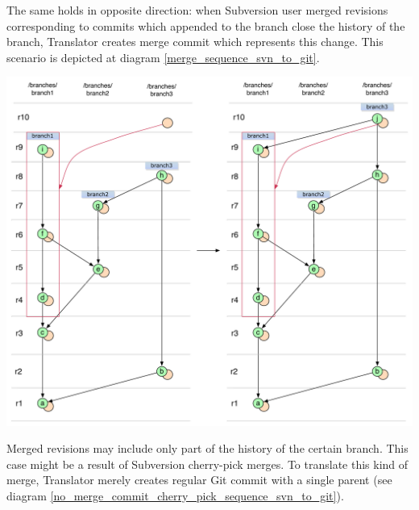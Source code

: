 The same holds in opposite direction: when Subversion user merged revisions corresponding to commits which appended to the branch close the history of the branch, Translator creates merge commit which represents this change. This scenario is depicted at diagram \ref{merge_sequence_svn_to_git}.

\begin{center}
\includegraphics[width=\textwidth]{img/diagrams/merge_sequence_svn_to_git.pdf}%
\label{merge_sequence_svn_to_git}%
\end{center}

Merged revisions may include only part of the history of the certain branch. 
This case might be a result of Subversion cherry-pick merges.
To translate this kind of merge, Translator merely creates regular Git commit with a single parent (see diagram \ref{no_merge_commit_cherry_pick_sequence_svn_to_git}). 

